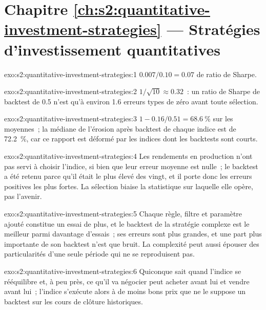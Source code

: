 \section*{Chapitre \ref{ch:s2:quantitative-investment-strategies} --- Stratégies d'investissement quantitatives}

\begin{solution}{exo:s2:quantitative-investment-strategies:1}
$0.007 / 0.10 = 0.07$ de ratio de Sharpe.
\end{solution}

\begin{solution}{exo:s2:quantitative-investment-strategies:2}
$1/\sqrt{10} \approx 0.32$~: un ratio de Sharpe de backtest de 0.5 n'est qu'à environ 1.6 erreurs types de zéro avant toute sélection.
\end{solution}

\begin{solution}{exo:s2:quantitative-investment-strategies:3}
$1 - 0.16/0.51 = 68.6~\%$ sur les moyennes~; la médiane de l'érosion après backtest de chaque indice est de 72.2~\%, car ce rapport est déformé par les indices dont les backtests sont courts.
\end{solution}

\begin{solution}{exo:s2:quantitative-investment-strategies:4}
Les rendements en production n'ont pas servi à choisir l'indice, si bien que leur erreur moyenne est nulle~; le backtest a été retenu parce qu'il était le plus élevé des vingt, et il
porte donc les erreurs positives les plus fortes. La sélection biaise la statistique sur laquelle elle opère, pas l'avenir.
\end{solution}

\begin{solution}{exo:s2:quantitative-investment-strategies:5}
Chaque règle, filtre et paramètre ajouté constitue un essai de plus, et le backtest de la stratégie complexe est le meilleur parmi davantage d'essais~; ses erreurs sont
plus grandes, et une part plus importante de son backtest n'est que bruit. La complexité peut aussi épouser des particularités d'une seule période qui ne se reproduisent pas.
\end{solution}

\begin{solution}{exo:s2:quantitative-investment-strategies:6}
Quiconque sait quand l'indice se rééquilibre et, à peu près, ce qu'il va négocier peut acheter avant lui et vendre avant lui~;
l'indice s'exécute alors à de moins bons prix que ne le suppose un backtest sur les cours de clôture historiques.
\end{solution}

